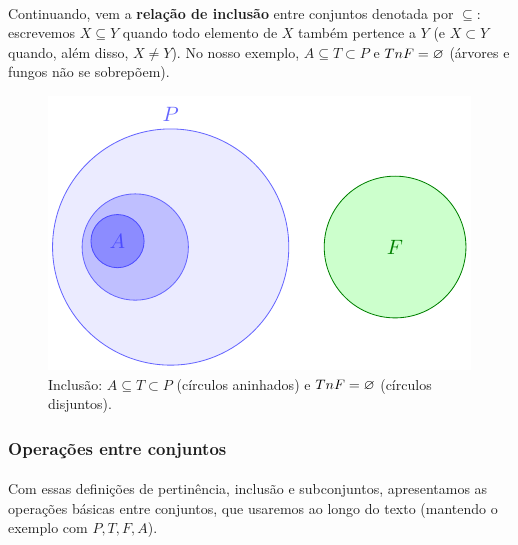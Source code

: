 \documentclass[12pt,a4paper]{article}
\def\cap{\string n}%
\begin{document}
\paragraph{}
Continuando, vem a \textbf{relação de inclusão} entre conjuntos denotada por \(\subseteq\): escrevemos \(X \subseteq Y\) quando todo elemento de \(X\) também pertence a \(Y\) (e \(X\subset Y\) quando, além disso, \(X\neq Y\)). No nosso exemplo, \(A\subseteq T\subset P\) e \(T\cap F=\varnothing\) (árvores e fungos não se sobrepõem).


\begin{figure}[H]
    \centering
    \includegraphics[width=0.9\linewidth]{figures/fig_inclusao.pdf}

    \caption{\texorpdfstring{Inclusão: $A\subseteq T\subset P$ (círculos aninhados) e $T\cap F=\varnothing$ (círculos disjuntos).}{Inclusão: conjuntos aninhados e disjuntos}}
    \label{fig:inclusao}\end{figure}


\subsubsection{Operações entre conjuntos}
\paragraph{}
Com essas definições de pertinência, inclusão e subconjuntos, apresentamos as operações básicas entre conjuntos, que usaremos ao longo do texto (mantendo o exemplo com \(P,T,F,A\)).
\end{document}
